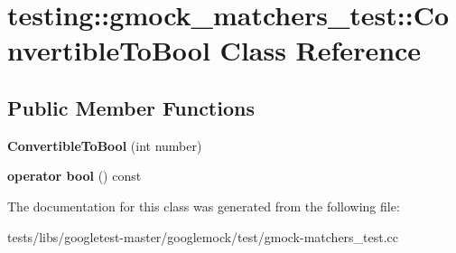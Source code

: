 \hypertarget{classtesting_1_1gmock__matchers__test_1_1ConvertibleToBool}{}\section{testing\+:\+:gmock\+\_\+matchers\+\_\+test\+:\+:Convertible\+To\+Bool Class Reference}
\label{classtesting_1_1gmock__matchers__test_1_1ConvertibleToBool}
\subsection*{Public Member Functions}
\begin{DoxyCompactItemize}
\item 
\mbox{\label{classtesting_1_1gmock__matchers__test_1_1ConvertibleToBool_a4e01a99e144a393bc11a40fb43e8a6f1}} 
{\bfseries Convertible\+To\+Bool} (int number)
\item 
\mbox{\label{classtesting_1_1gmock__matchers__test_1_1ConvertibleToBool_a4ad9766b9d5179a1207af2449405f071}} 
{\bfseries operator bool} () const
\end{DoxyCompactItemize}


The documentation for this class was generated from the following file\+:\begin{DoxyCompactItemize}
\item 
tests/libs/googletest-\/master/googlemock/test/gmock-\/matchers\+\_\+test.\+cc\end{DoxyCompactItemize}
